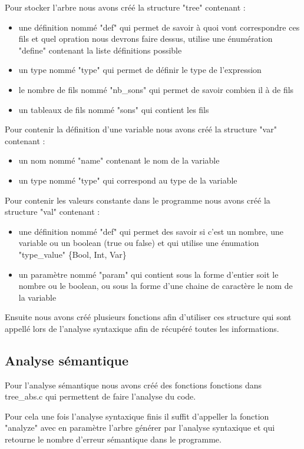 \documentclass{report}
\begin{document}
Pour stocker l'arbre nous avons créé la structure "tree" contenant :
\begin{itemize}
\item une définition nommé "def" qui permet de savoir à quoi vont correspondre ces fils et quel opration nous devrons faire dessus, utilise une énumération "define" contenant la liste définitions possible
\item un type nommé "type" qui permet de définir le type de l'expression
\item le nombre de fils nommé "nb\_sons" qui permet de savoir combien il à de fils
\item un tableaux de fils nommé "sons" qui contient les fils
\end{itemize}
\bigskip

Pour contenir la définition d'une variable nous avons créé la structure "var" contenant :
\begin{itemize}
\item un nom nommé "name" contenant le nom de la variable
\item un type nommé "type" qui correspond au type de la variable
\end{itemize}
\bigskip

Pour contenir les valeurs constante dans le programme nous avons créé la structure "val" contenant :
\begin{itemize}
\item une définition nommé "def" qui permet des savoir si c'est un nombre, une variable ou un boolean (true ou false) et qui utilise une énumation "type\_value" \{Bool, Int, Var\}
\item un paramètre nommé "param" qui contient sous la forme d'entier soit le nombre ou le boolean, ou sous la forme d'une chaine de caractère le nom de la variable
\end{itemize}
\bigskip

Ensuite nous avons créé plusieurs fonctions afin d'utiliser ces structure qui sont appellé lors de l'analyse syntaxique afin de récupéré toutes les informations. 

\subsection{Analyse sémantique}
Pour l'analyse sémantique nous avons créé des fonctions fonctions dans tree\_abs.c qui permettent de faire l'analyse du code.

Pour cela une fois l'analyse syntaxique finis il suffit d'appeller la fonction "analyze" avec en paramètre l'arbre générer par l'analyse syntaxique et qui retourne le nombre d'erreur sémantique dans le programme.
\end{document}
